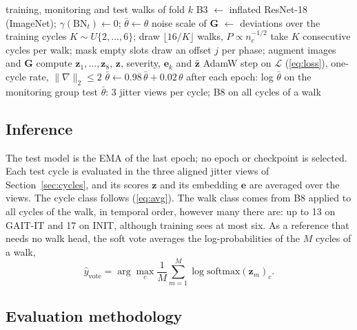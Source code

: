 \documentclass[conference]{IEEEtran}
\begin{document}
\begin{algorithm}[t]
\caption{Training and testing in one fold}
\label{alg:fold}
\begin{algorithmic}[1]
\Require training, monitoring and test walks of fold $k$
\State B3 $\leftarrow$ inflated ResNet-18 (ImageNet); $\gamma(\mathrm{BN}_t)\leftarrow0$; $\bar{\theta}\leftarrow\theta$
\State noise scale of $\mathbf{G}$ $\leftarrow$ deviations over the training cycles
\State $K\sim U\{2,\dots,6\}$; draw $\lfloor16/K\rfloor$ walks, $P\propto n_c^{-1/2}$
\State take $K$ consecutive cycles per walk; mask empty slots
\State draw an offset $j$ per phase; augment images and $\mathbf{G}$
\State compute $\mathbf{z}_1,\dots,\mathbf{z}_8$, $\mathbf{z}$, severity, $\mathbf{e}_k$ and $\hat{\mathbf{z}}$
\State AdamW step on $\mathcal{L}$ (\ref{eq:loss}), one-cycle rate, $\|\nabla\|_2\le2$
\State $\bar{\theta}\leftarrow0.98\,\bar{\theta}+0.02\,\theta$
\State after each epoch: log $\bar{\theta}$ on the monitoring group
\EndFor
\State test $\bar{\theta}$: 3 jitter views per cycle; B8 on all cycles of a walk
\end{algorithmic}
\end{algorithm}

\subsection{Inference}
\label{sec:infer}

The test model is the EMA of the last epoch; no epoch or checkpoint is selected. Each test cycle is evaluated in the three aligned jitter views of Section~\ref{sec:cycles}, and its scores $\mathbf{z}$ and its embedding $\mathbf{e}$ are averaged over the views. The cycle class follows (\ref{eq:avg}). The walk class comes from B8 applied to all cycles of the walk, in temporal order, however many there are: up to 13 on GAIT-IT and 17 on INIT, although training sees at most six. As a reference that needs no walk head, the soft vote averages the log-probabilities of the $M$ cycles of a walk,
\begin{equation}
\hat{y}_{\mathrm{vote}}=\arg\max_c\frac{1}{M}\sum_{m=1}^{M}\log\mathrm{softmax}(\mathbf{z}_m)_c.
\label{eq:vote}
\end{equation}

\subsection{Evaluation methodology}
\label{sec:eval}
\end{document}
